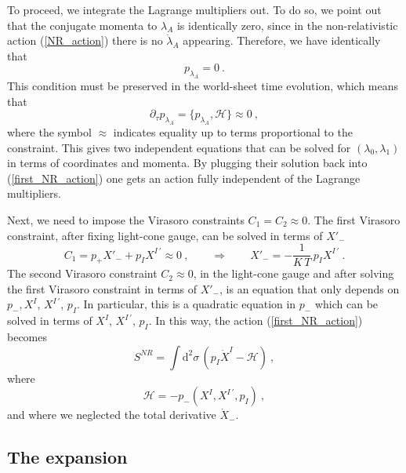 \documentclass[12pt]{article}
\def\dd{\text{d}}
\numberwithin{equation}{section}
\begin{document}
To proceed, we integrate the Lagrange multipliers out.  To do so, we point out that the conjugate momenta to $\lambda_A$ is identically zero, since in the non-relativistic action (\ref{NR_action}) there is no $\dot{\lambda}_A$ appearing. Therefore, we have identically that 
\begin{equation}
p_{\lambda_A} = 0 \ .
\end{equation}
This condition must be preserved in the world-sheet time evolution, which means that
\begin{equation}
\partial_{\tau} p_{\lambda_A} = \{ p_{\lambda_A}, \mathcal{H}\} \approx 0 \ ,
\end{equation}
where the symbol $\approx$ indicates equality up to terms proportional to the constraint. This gives two independent equations that can be solved for $(\lambda_0, \lambda_1)$ in terms of coordinates and momenta.  By plugging their solution back into (\ref{first_NR_action}) one gets an action fully independent of the Lagrange multipliers. 

Next,  we need to impose the Virasoro constraints $C_1 = C_2  \approx  0$.  The first Virasoro constraint, after fixing light-cone gauge, can be solved in terms of $X'_-$
\begin{equation}
C_1 = p_+ X'_- + p_I X^{I \, '}  \approx  0 \ ,  \qquad \Longrightarrow \qquad X'_- = - \frac{1}{K\, T}\, p_I X^{I \, '} \ . 
\end{equation}
The second Virasoro constraint $C_2  \approx  0$, in the light-cone gauge and after solving the first Virasoro constraint in terms of $X'_-$,  is an equation that only depends on $p_-, X^I$, $X^{I\, '}$, $p_I$.  In particular, this is a quadratic equation in $p_-$ which can be solved in terms of $X^I$, $X^{I\, '}$, $p_I$.  
In this way, the action (\ref{first_NR_action}) becomes 
\begin{equation}
S^{NR} = \int \dd^2 \sigma \, (p_I \dot{X}^I - \mathcal{H} ) \ , 
\end{equation}
where
\begin{equation}
\label{Ham_p-}
 \mathcal{H} = - p_- (X^I, X^{I\, '}, p_I) \ , 
\end{equation}
and where we neglected the total derivative $\dot{X}_-$.  




\subsection{The expansion}
\end{document}
